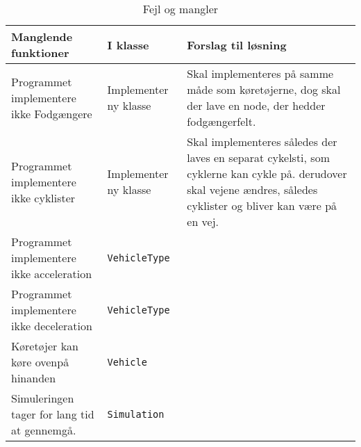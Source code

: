 \begin{table}[H]
\centering
\caption{Fejl og mangler}
\label{Fejl og mangler}
\begin{tabular}{|l|l|l|}
\hline
\textbf{Manglende funktioner}                                                                               & \textbf{I klasse}                  & \textbf
Forslag til løsning}                                                                                                                                       \\ \hline
Programmet implementere ikke Fodgængere                                                                     & Implementer ny klasse              & Skal implementeres på samme måde som køretøjerne, dog skal der lave en node, der hedder fodgængerfelt.                                                             \\ \hline
Programmet implementere ikke cyklister                                                                      & Implementer ny klasse              & Skal implementeres således der laves en separat cykelsti, som cyklerne kan cykle på. derudover skal vejene ændres, således cyklister og bliver kan være på en vej. \\ \hline
Programmet implementere ikke acceleration                                                                   & \texttt{VehicleType}               &                                                                                                                                                                    \\ \hline
Programmet implementere ikke deceleration                                                                   & \texttt{VehicleType}               &                                                                                                                                                                    \\ \hline
Køretøjer kan køre ovenpå hinanden                                                                          & \texttt{Vehicle}                   &                                                                                                                                                                    \\ \hline
Simuleringen tager for lang tid at gennemgå.                                                                & \texttt{Simulation}                &                                                                                                                                                                    \\ \hline

\end{tabular}
\end{table}
